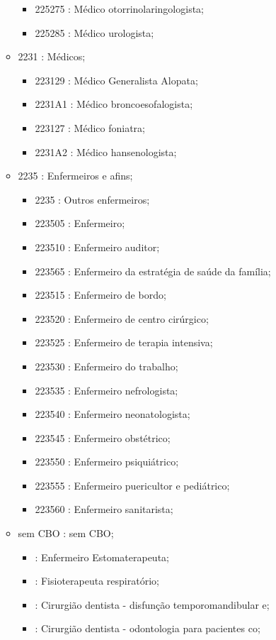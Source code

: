 \begin{itemize}
\begin{itemize}
\begin{itemize}
      \item 225275 : Médico otorrinolaringologista;
      \item 225285 : Médico urologista;
    \end{itemize}
    \item 2231 : Médicos;
    \begin{itemize}
      \item 223129 : Médico Generalista Alopata;
      \item 2231A1 : Médico broncoesofalogista;
      \item 223127 : Médico foniatra;
      \item 2231A2 : Médico hansenologista;
    \end{itemize}
    \item 2235 : Enfermeiros e afins;
    \begin{itemize}
      \item 2235 : Outros enfermeiros;
      \item 223505 : Enfermeiro;
      \item 223510 : Enfermeiro auditor;
      \item 223565 : Enfermeiro da estratégia de saúde da família;
      \item 223515 : Enfermeiro de bordo;
      \item 223520 : Enfermeiro de centro cirúrgico;
      \item 223525 : Enfermeiro de terapia intensiva;
      \item 223530 : Enfermeiro do trabalho;
      \item 223535 : Enfermeiro nefrologista;
      \item 223540 : Enfermeiro neonatologista;
      \item 223545 : Enfermeiro obstétrico;
      \item 223550 : Enfermeiro psiquiátrico;
      \item 223555 : Enfermeiro puericultor e pediátrico;
      \item 223560 : Enfermeiro sanitarista;
    \end{itemize}
    \item sem CBO : sem CBO;
    \begin{itemize}
      \item  : Enfermeiro Estomaterapeuta;
      \item  : Fisioterapeuta respiratório;
      \item  : Cirurgião dentista - disfunção temporomandibular e;
      \item  : Cirurgião dentista - odontologia para pacientes co;

\end{itemize}
\end{itemize}
\end{itemize}
